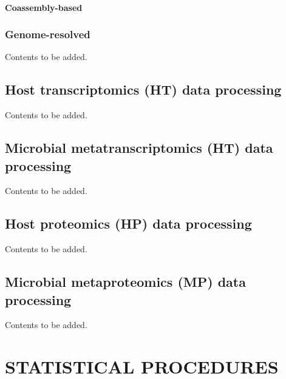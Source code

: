 \documentclass[
]{book}
\begin{document}
\hypertarget{coassembly-based}{%
\subsection{Coassembly-based}\label{coassembly-based}}

\hypertarget{genome-resolved}{%
\section{Genome-resolved}\label{genome-resolved}}

Contents to be added.

\hypertarget{host-transcriptomics-data-processing}{%
\chapter{Host transcriptomics (HT) data processing}\label{host-transcriptomics-data-processing}}

Contents to be added.

\hypertarget{microbial-metatranscriptomics-data-processing}{%
\chapter{Microbial metatranscriptomics (HT) data processing}\label{microbial-metatranscriptomics-data-processing}}

Contents to be added.

\hypertarget{host-proteomics-data-processing}{%
\chapter{Host proteomics (HP) data processing}\label{host-proteomics-data-processing}}

Contents to be added.

\hypertarget{microbial-metaproteomics-data-processing}{%
\chapter{Microbial metaproteomics (MP) data processing}\label{microbial-metaproteomics-data-processing}}

Contents to be added.

\hypertarget{part-statistical-procedures}{%
\part{STATISTICAL PROCEDURES}\label{part-statistical-procedures}}
\end{document}

